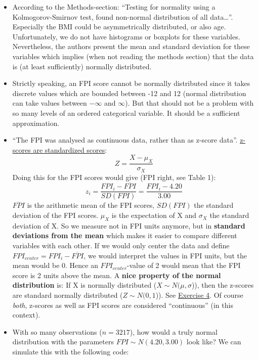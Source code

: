 \documentclass[
]{book}
\begin{document}
\begin{itemize}
\item
  According to the Methods-section:
  ``Testing for normality using a Kolmogorov-Smirnov test,
  found non-normal distribution of all data\ldots{}''.
  Especially the BMI could be asymmetrically distributed, or also age. Unfortunately, we do not have
  histograms or boxplots for these variables. Nevertheless, the authors present the mean and standard deviation
  for these variables which implies (when not reading the methods section) that the data is (at least sufficiently)
  normally distributed.
\item
  Strictly speaking, an FPI score cannot be normally distributed since it takes discrete values which are bounded
  between -12 and 12 (normal distribution can take values between \(-\infty\) and \(\infty\)). But that should not be a problem with so many levels of an ordered categorical variable.
  It should be a sufficient approximation.
\item
  ``The FPI was analysed as continuous data, rather than as z-score data''.
  \href{https://www.youtube.com/watch?v=5S-Zfa-vOXs&ab_channel=KhanAcademy}{z-scores are standardized scores}:
  \[Z = \frac{X - \mu_X}{\sigma_X}\]
  Doing this for the FPI scores would give (FPI right, see Table 1):
  \[z_i = \frac{FPI_i - \overline{FPI}}{SD(FPI)} = \frac{FPI_i - 4.20}{3.00}\]
  \(\overline{FPI}\) is the arithmetic mean of the FPI scores, \(SD(FPI)\) the standard deviation of the FPI scores.
  \(\mu_X\) is the expectation of X and \(\sigma_X\) the standard deviation of X.
  So we measure not in FPI units anymore, but in \textbf{standard deviations from the mean} which makes
  it easier to compare different variables with each other. If we would only center the data and
  define \(FPI_{center} = FPI_i - \overline{FPI}\), we would interpret the values in FPI units, but
  the mean would be 0. Hence an \(FPI_{center}\)-value of 2 would mean that the FPI score is 2 units above the mean.
  A \textbf{nice property of the normal distribution} is: If X is normally distributed (\(X \sim N(\mu, \sigma\))),
  then the z-scores are standard normally distributed (\(Z \sim N(0,1\))).
  See \hyperref[exercise4_descriptive_stats]{Exercise 4}. Of course \emph{both}, z-scores as well as FPI scores are
  considered ``continuous'' (in this context).
\item
  With so many observations (\(n=3217\)), how would a truly normal distribution with the parameters
  \(FPI \sim N(4.20, 3.00)\) look like? We can simulate this with the following code:
\end{itemize}
\end{document}
